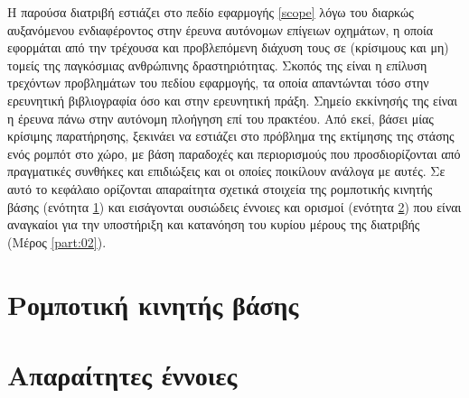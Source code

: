 Η παρούσα διατριβή εστιάζει στο πεδίο εφαρμογής \ref{scope} λόγω του διαρκώς
αυξανόμενου ενδιαφέροντος στην έρευνα αυτόνομων επίγειων οχημάτων, η οποία
εφορμάται από την τρέχουσα και προβλεπόμενη διάχυση τους σε (κρίσιμους και μη)
τομείς της παγκόσμιας ανθρώπινης δραστηριότητας. Σκοπός της είναι η επίλυση
τρεχόντων προβλημάτων του πεδίου εφαρμογής, τα οποία απαντώνται τόσο στην
ερευνητική βιβλιογραφία όσο και στην ερευνητική πράξη. Σημείο εκκίνησής της
είναι η έρευνα πάνω στην αυτόνομη πλοήγηση επί του πρακτέου. Από εκεί, βάσει
μίας κρίσιμης παρατήρησης, ξεκινάει να εστιάζει στο πρόβλημα της εκτίμησης της
στάσης ενός ρομπότ στο χώρο, με βάση παραδοχές και περιορισμούς που
προσδιορίζονται από πραγματικές συνθήκες και επιδιώξεις και οι οποίες ποικίλουν
ανάλογα με αυτές. Σε αυτό το κεφάλαιο ορίζονται απαραίτητα σχετικά στοιχεία της
ρομποτικής κινητής βάσης (ενότητα \ref{section:01_01_01}) και εισάγονται
ουσιώδεις έννοιες και ορισμοί (ενότητα \ref{section:01_01_02}) που είναι
αναγκαίοι για την υποστήριξη και κατανόηση του κυρίου μέρους της διατριβής
(Μέρος \ref{part:02}).


\section{Ρομποτική κινητής βάσης}
\label{section:01_01_01}


\section{Απαραίτητες έννοιες}
\label{section:01_01_02}

